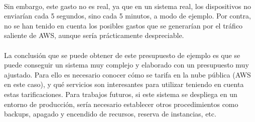 \documentclass[../../memoria.tex]{subfiles}
\begin{document}
\paragraph{}
Sin embargo, este gasto no es real, ya que en un sistema real, los dispositivos no enviarían cada 5 segundos, sino cada 5 minutos, a modo de ejemplo. Por contra, no se han tenido en cuenta los posibles gastos que se generarían por el tráfico saliente de AWS, aunque sería prácticamente despreciable.

\paragraph{}
La conclusión que se puede obtener de este presupuesto de ejemplo es que se puede conseguir un sistema muy complejo y elaborado con un presupuesto muy ajustado. Para ello es necesario conocer cómo se tarifa en la nube pública (AWS en este caso), y qué servicios son interesantes para utilizar teniendo en cuenta estas tarificaciones. Para trabajos futuros, si este sistema se despliega en un entorno de producción, sería necesario establecer otros procedimientos como backups, apagado y encendido de recursos, reserva de instancias, etc.
\end{document}

